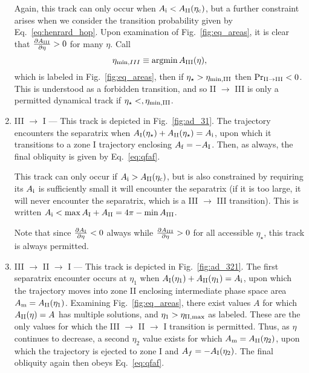 \documentclass[
        fleqn,
        usenatbib,
        referee,
    ]{mnras}
\newcommand*{\pd}[2]{\frac{\partial#1}{\partial#2}}
\DeclareMathOperator*{\argmin}{argmin}
\begin{document}
\begin{enumerate}
        Again, this track can only occur when $A_{\rm i} < A_{\rm II}(\eta_{\rm c})$, but a
        further constraint arises when we consider the transition probability
        given by Eq.~\eqref{eq:henrard_hop}. Upon examination of
        Fig.~\ref{fig:eq_areas}, it is clear that $\pd{A_{\rm III}}{\eta} > 0$ for
        many $\eta$. Call
        \begin{equation}
            \eta_{\min, III} \equiv \argmin A_{\rm III}(\eta)
                \label{eq:eta_minIII},
        \end{equation}
        which is labeled in Fig.~\ref{fig:eq_areas}, then if $\eta_\star >
        \eta_{\rm \min, III}$ then $\Pr_{\rm II \to III} < 0$. This is
        understood as a forbidden transition, and so II $\to$ III is only a
        permitted dynamical track if $\eta_\star <, \eta_{\rm \min, III}$.

    \item III $\to$ I --- This track is depicted in Fig.~\ref{fig:ad_31}.
        The trajectory encounters the separatrix when $A_{\rm I}(\eta_\star) +
        A_{\rm II}(\eta_\star) = A_{\rm i}$, upon which it transitions to a zone
        I trajectory enclosing $A_{\rm f} = -A_{\rm I}$. Then, as always, the
        final obliquity is given by Eq.~\eqref{eq:qfaf}.

        This track can only occur if $A_{\rm i} > A_{\rm II}(\eta_{\rm c})$, but is also
        constrained by requiring its $A_{\rm i}$ is sufficiently small it will
        encounter the separatrix (if it is too large, it will never encounter
        the separatrix, which is a III $\to$ III transition). This is written
        $A_{\rm i} < \max A_{\rm I} + A_{\rm II} = 4\pi - \min A_{\rm III}$.

        Note that since $\pd{A_{\rm I}}{\eta} < 0$ always while $\pd{A_{\rm
        III}}{\eta} > 0$ for all accessible $\eta_{\star}$, this track is always
        permitted.

    \item III $\to$ II $\to$ I --- This track is depicted in
        Fig.~\ref{fig:ad_321}. The first separatrix encounter occurs at $\eta_1$
        when $A_{\rm I}(\eta_1) + A_{\rm II}(\eta_1) = A_{\rm i}$, upon which
        the trajectory moves into zone II enclosing intermediate phase space
        area $A_{\rm m} = A_{\rm II}(\eta_1)$. Examining
        Fig.~\ref{fig:eq_areas}, there exist values $A$ for which $A_{\rm
        II}(\eta) = A$ has multiple solutions, and $\eta_1 > \eta_{\rm II,
        \max}$ as labeled. These are the only values for which the III $\to$ II
        $\to$ I transition is permitted. Thus, as $\eta$ continues to decrease,
        a second $\eta_2$ value exists for which $A_{\rm m} = A_{\rm
        II}(\eta_2)$, upon which the trajectory is ejected to zone I and $A_f =
        -A_{\rm I}(\eta_2)$. The final obliquity again then obeys
        Eq.~\eqref{eq:qfaf}.


\end{enumerate}
\end{document}
